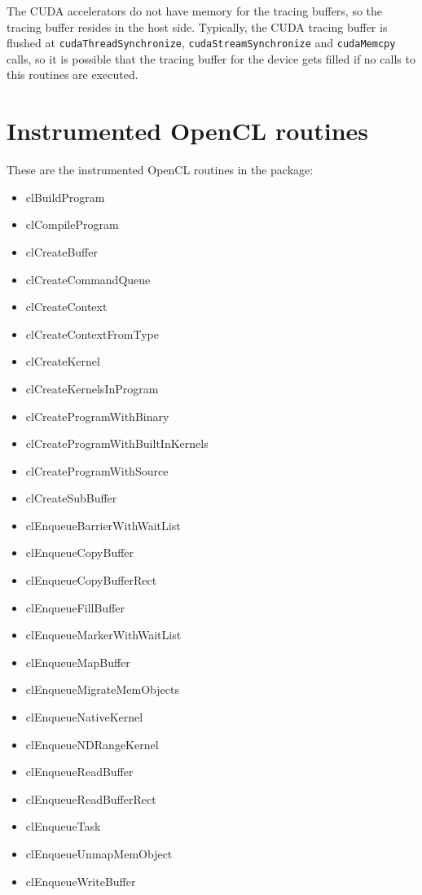 The CUDA accelerators do not have memory for the tracing buffers, so the tracing buffer resides in the host side.
Typically, the CUDA tracing buffer is flushed at {\tt cudaThreadSynchronize}, {\tt cudaStreamSynchronize} and {\tt cudaMemcpy} calls, so it is possible that the tracing buffer for the device gets filled if no calls to this routines are executed.

\section{Instrumented OpenCL routines}\label{sec:OPENCLinstrumentedroutines}

These are the instrumented OpenCL routines in the \TRACE package:

\begin{itemize}
\item clBuildProgram
\item clCompileProgram
\item clCreateBuffer
\item clCreateCommandQueue
\item clCreateContext
\item clCreateContextFromType
\item clCreateKernel
\item clCreateKernelsInProgram
\item clCreateProgramWithBinary
\item clCreateProgramWithBuiltInKernels
\item clCreateProgramWithSource
\item clCreateSubBuffer
\item clEnqueueBarrierWithWaitList\footnotemark[5]
\item clEnqueueCopyBuffer
\item clEnqueueCopyBufferRect
\item clEnqueueFillBuffer
\item clEnqueueMarkerWithWaitList\footnotemark[5]
\item clEnqueueMapBuffer
\item clEnqueueMigrateMemObjects\footnotemark[5]
\item clEnqueueNativeKernel
\item clEnqueueNDRangeKernel
\item clEnqueueReadBuffer
\item clEnqueueReadBufferRect
\item clEnqueueTask
\item clEnqueueUnmapMemObject
\item clEnqueueWriteBuffer

\end{itemize}
